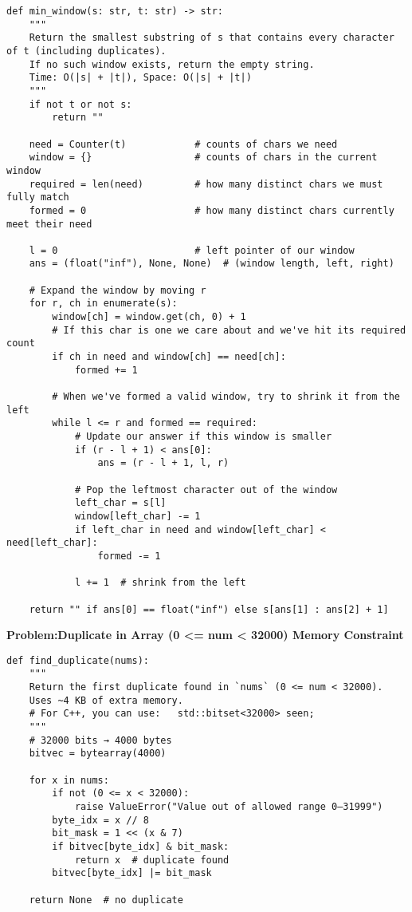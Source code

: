 \begin{verbatim}
def min_window(s: str, t: str) -> str:
    """
    Return the smallest substring of s that contains every character of t (including duplicates).
    If no such window exists, return the empty string.
    Time: O(|s| + |t|), Space: O(|s| + |t|)
    """
    if not t or not s:
        return ""

    need = Counter(t)            # counts of chars we need
    window = {}                  # counts of chars in the current window
    required = len(need)         # how many distinct chars we must fully match
    formed = 0                   # how many distinct chars currently meet their need

    l = 0                        # left pointer of our window
    ans = (float("inf"), None, None)  # (window length, left, right)

    # Expand the window by moving r
    for r, ch in enumerate(s):
        window[ch] = window.get(ch, 0) + 1
        # If this char is one we care about and we've hit its required count
        if ch in need and window[ch] == need[ch]:
            formed += 1

        # When we've formed a valid window, try to shrink it from the left
        while l <= r and formed == required:
            # Update our answer if this window is smaller
            if (r - l + 1) < ans[0]:
                ans = (r - l + 1, l, r)

            # Pop the leftmost character out of the window
            left_char = s[l]
            window[left_char] -= 1
            if left_char in need and window[left_char] < need[left_char]:
                formed -= 1

            l += 1  # shrink from the left

    return "" if ans[0] == float("inf") else s[ans[1] : ans[2] + 1]

\end{verbatim}

\noindent\textbf{Problem:Duplicate in Array (0 <= num < 32000) Memory Constraint}
\begin{verbatim}
def find_duplicate(nums):
    """
    Return the first duplicate found in `nums` (0 <= num < 32000).
    Uses ~4 KB of extra memory.
    # For C++, you can use:   std::bitset<32000> seen;
    """
    # 32000 bits → 4000 bytes
    bitvec = bytearray(4000)

    for x in nums:
        if not (0 <= x < 32000):
            raise ValueError("Value out of allowed range 0–31999")
        byte_idx = x // 8
        bit_mask = 1 << (x & 7)
        if bitvec[byte_idx] & bit_mask:
            return x  # duplicate found
        bitvec[byte_idx] |= bit_mask

    return None  # no duplicate
\end{verbatim}

